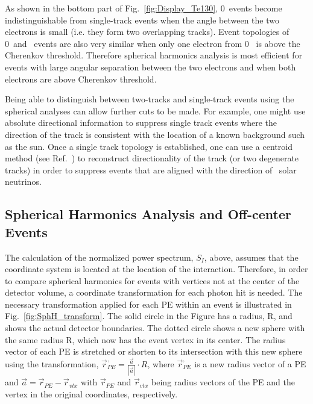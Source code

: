 
As shown in the bottom part of Fig.~\ref{fig:Display_Te130}, 0\nbb~events become indistinguishable from single-track events when the angle between the two electrons is small (i.e. they form two overlapping tracks). Event topologies of 0\nbb~and \B~events are also very similar when only one electron from 0\nbb~ is above the Cherenkov threshold. Therefore spherical harmonics analysis is most efficient for events with large angular separation between the two electrons and when both electrons are above Cherenkov threshold. 

Being able to distinguish between two-tracks and single-track events using the spherical analyses can allow further cuts to be made.  For example, one might use absolute directional information to suppress single track events where the direction of the track is consistent with the location of a known background such as the sun. Once a single track topology is established, one can use a centroid method (see Ref.~\cite{Directionality}) to reconstruct directionality of the track (or two degenerate tracks) in order to suppress events that are aligned with the direction of \B~solar neutrinos.

\subsection{Spherical Harmonics Analysis and Off-center Events}

The calculation of the normalized power spectrum, $S_I$, above, assumes that the coordinate system is located at the location of the interaction.  Therefore, in order to compare spherical harmonics for events with vertices not at the center of the detector volume, a coordinate transformation for each photon hit is needed. The necessary transformation applied for each PE within an event is illustrated in Fig.~\ref{fig:SphH_transform}. The solid circle in the Figure has a radius, R, and shows the actual detector boundaries. The dotted circle shows a new sphere with the same radius R, which now has the event vertex in its center. The radius vector of each PE is stretched or shorten to its intersection with this new sphere using the transformation, $\vec{r}^{,}_{PE} = \frac{\vec{a}}{|\vec{a}|} \cdot R$, where $\vec{r}^{,}_{PE}$ is a new radius vector of a PE and $\vec{a}=\vec{r}_{PE} - \vec{r}_{vtx}$ with $\vec{r}_{PE}$ and $\vec{r}_{vtx}$ being radius vectors of the PE and the vertex in the original coordinates, respectively.

